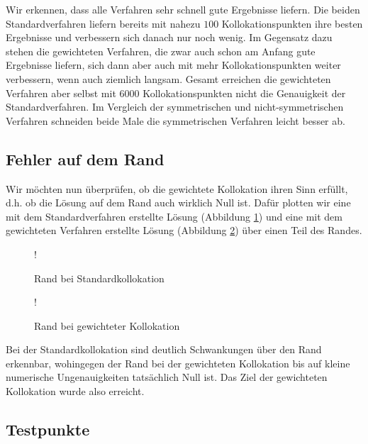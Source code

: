 Wir erkennen, dass alle Verfahren sehr schnell gute Ergebnisse liefern. Die beiden Standardverfahren liefern bereits mit nahezu $100$ Kollokationspunkten ihre besten Ergebnisse und verbessern sich danach nur noch wenig. Im Gegensatz dazu stehen die gewichteten Verfahren, die zwar auch schon am Anfang gute Ergebnisse liefern, sich dann aber auch mit mehr Kollokationspunkten weiter verbessern, wenn auch ziemlich langsam. Gesamt erreichen die gewichteten Verfahren aber selbst mit $6000$ Kollokationspunkten nicht die Genauigkeit der Standardverfahren. Im Vergleich der symmetrischen und nicht-symmetrischen Verfahren schneiden beide Male die symmetrischen Verfahren leicht besser ab.

\subsection{Fehler auf dem Rand}

Wir möchten nun überprüfen, ob die gewichtete Kollokation ihren Sinn erfüllt, d.h. ob die Lösung auf dem Rand auch wirklich Null ist. Dafür plotten wir eine mit dem Standardverfahren erstellte Lösung (Abbildung \ref{fig:rand standard}) und eine mit dem gewichteten Verfahren erstellte Lösung (Abbildung \ref{fig:rand weighted}) über einen Teil des Randes.

\begin{figure}[H]
\centering
\resizebox {.75\columnwidth} {!} {

}
\caption{Rand bei Standardkollokation}
\label{fig:rand standard}
\end{figure}
\begin{figure}[H]
\centering
\resizebox {.75\columnwidth} {!} {

}
\caption{Rand bei gewichteter Kollokation}
\label{fig:rand weighted}
\end{figure}

Bei der Standardkollokation sind deutlich Schwankungen über den Rand erkennbar, wohingegen der Rand bei der gewichteten Kollokation bis auf kleine numerische Ungenauigkeiten tatsächlich Null ist. Das Ziel der gewichteten Kollokation wurde also erreicht.

\subsection{Testpunkte}

